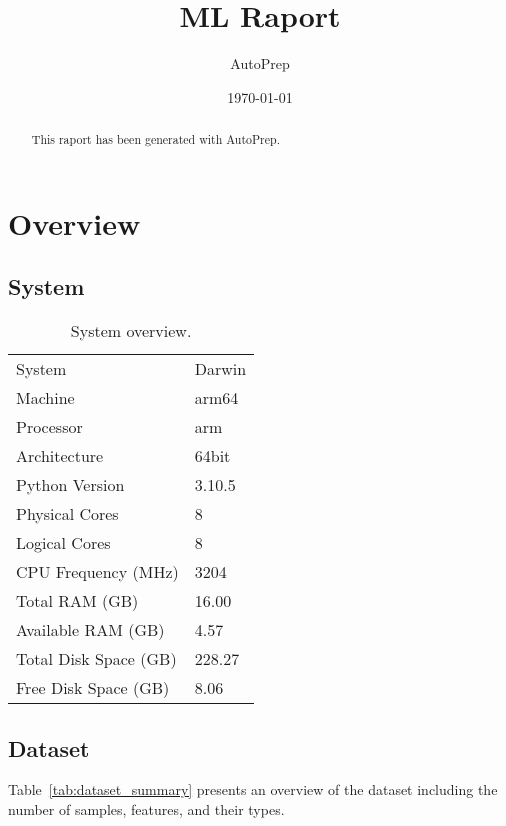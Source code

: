 \documentclass{article}%
\title{ML Raport}%
\author{AutoPrep}%
\date{\today}%
\begin{document}
%
\normalsize%
\maketitle%

    \begin{abstract}
    This raport has been generated with AutoPrep.
    \end{abstract}
\tableofcontents%
\newpage%
\section{Overview}%
\label{sec:Overview}%

%
\subsection{System}%
\label{subsec:System}%

%


\begin{table}[H]%
\begin{center}%
\renewcommand{\arraystretch}{1.5}%
\begin{tabular}{l l}%
\hline%
System&Darwin\\%
Machine&arm64\\%
Processor&arm\\%
Architecture&64bit\\%
Python Version&3.10.5\\%
Physical Cores&8\\%
Logical Cores&8\\%
CPU Frequency (MHz)&3204\\%
Total RAM (GB)&16.00\\%
Available RAM (GB)&4.57\\%
Total Disk Space (GB)&228.27\\%
Free Disk Space (GB)&8.06\\%
\hline%
\end{tabular}%
\end{center}%
\caption{System overview.}%
\end{table}

%
\subsection{Dataset}%
\label{subsec:Dataset}%

%
Table~\ref{tab:dataset_summary} %
presents an overview of the dataset including the number of samples, features, and their types.%
\end{document}
